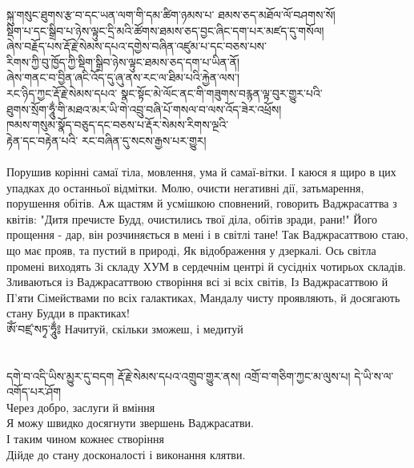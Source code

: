 \newpage
\ti
སྐུ་གསུང་ཐུགས་རྩ་བ་དང་ཡན་ལག་གི་དམ་ཚིག་ཉམས་པ་ ཐམས་ཅད་མཐོལ་ལོ་བཤགས་སོ། \\
སྡིག་པ་དང་སྒྲིབ་པ་ཉེས་ལྟུང་དྲི་མའི་ཚོགས་ཐམས་ཅད་བྱང་ཞིང་དག་པར་མཛད་དུ་གསོལ། \\
ཞེས་བརྗོད་པས་རྡོ་རྗེ་སེམས་དཔའ་དགྱེས་བཞིན་འཛུམ་པ་དང་བཅས་པས་ \\
རིགས་ཀྱི་བུ་ཁྱོད་ཀྱི་སྡིག་སྒྲིབ་ཉེས་ལྟུང་ཐམས་ཅད་དག་པ་ཡིན་ནོ། \\
ཞེས་གནང་བ་བྱིན་ཞངི་འོད་དུ་ཞུ་ནས་རང་ལ་ཐིམ་པའི་རྐྱེན་ལས་། \\
རང་ཉིད་ཀྱང་རྡོ་རྗེ་སེམས་དཔའ་ སྣང་སྟོང་མེ་ལོང་ནང་གི་གཟུགས་བརྙན་ལྟ་བུར་གྱུར་པའི་ \\
ཐུགས་སྲོག་ཧཱུྂ་གི་མཐའ་མར་ཡི་གེ་འབྲུ་བཞི་པོ་གསལ་བ་ལས་འོད་ཟེར་འཕྲོས། \\
ཁམས་གསུམ་སྣོད་བཅུད་དང་བཅས་པ་རྡོར་སེམས་རིགས་ལྔའི་\\
རྟེན་དང་བརྟེན་པའི་ རང་བཞིན་དུ་སངས་རྒྱས་པར་གྱུར།\\
\\
\ru
Порушив корінні самаї тіла, мовлення, ума й самаї-вітки.
І каюся я щиро в цих упадках до останньої відмітки.
Молю, очисти негативні дії, затьмарення, порушення обітів.
Аж щастям й усмішкою сповнений, говорить Ваджрасаттва з квітів:
"Дитя пречисте Будд, очистились твої діла, обітів зради, рани!"
Його прощення - дар, він розчиняється в мені і в світлі тане!
Так Ваджрасаттвою стаю, що має прояв, та пустий в природі,
Як відображення у дзеркалі. Ось світла промені виходять
Зі складу ХУМ в сердечнім центрі й сусідніх чотирьох складів.
Зливаються із Ваджрасаттвою створіння всі зі всіх світів,
Із Ваджрасаттвою й П'яти Сімействами по всіх галактиках,
Мандалу чисту проявляють, й досягають стану Будди в практиках!
\\

\scriptsize
\ti
ཨོཾ་བཛྲ་སཏྭ་ཧཱུྂ༔ \ru Начитуй, скільки зможеш, і медитуй\\
\\
\\
\ti
དགེ་བ་འདི་ཡིས་མྱུར་དུ་བདག རྡོ་རྗེ་སེམས་དཔའ་འགྲུབ་གྱུར་ནས། འགྲོ་བ་གཅིག་ཀྱང་མ་ལུས་པ། དེ་ཡི་ས་ལ་འགོད་པར་ཤོག\\
\ru
Через добро, заслуги й вміння\\
Я можу швидко досягнути звершень Ваджрасатви.\\
І таким чином кожнеє створіння\\
Дійде до стану досконалості і виконання клятви.\\
\normalsize
